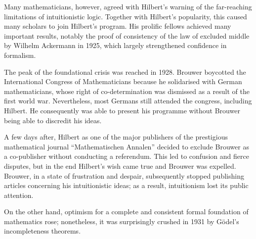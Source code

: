 \documentclass{article}
\begin{document}
Many mathematicians, however, agreed with Hilbert's warning of the far-reaching limitations of intuitionistic logic. Together with Hilbert's popularity, this caused many scholars to join Hilbert's program. His prolific fellows achieved many important results, notably the proof of consistency of the law of excluded middle by Wilhelm Ackermann in 1925, which largely strengthened confidence in formalism.

The peak of the foundational crisis was reached in 1928. Brouwer boycotted the International Congress of Mathematicians because he solidarised with German mathematicians, whose right of co-determination was dismissed as a result of the first world war. Nevertheless, most Germans still attended the congress, including Hilbert. He consequently was able to present his programme without Brouwer being able to discredit his ideas.

A few days after, Hilbert as one of the major publishers of the prestigious mathematical journal ``Mathematischen Annalen'' decided to exclude Brouwer as a co-publisher without conducting a referendum. This led to confusion and fierce disputes, but in the end Hilbert's wish came true and Brouwer was expelled. Brouwer, in a state of frustration and despair, subsequently stopped publishing articles concerning his intuitionistic ideas; as a result, intuitionism lost its public attention.  

On the other hand, optimism for a complete and consistent formal foundation of mathematics rose; nonetheless, it was surprisingly crushed in 1931 by Gödel's incompleteness theorems.
\end{document}
